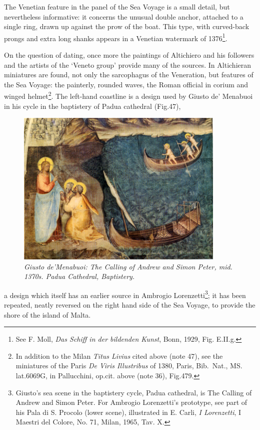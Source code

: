 \documentclass[a4paper,12pt]{article}
\begin{document}
The Venetian feature in the panel of the Sea Voyage is a small detail,
but nevertheless informative: it concerns the unusual double anchor,
attached to a single ring, drawn up against the prow of the boat.
This type, with curved-back prongs and extra long shanks appears in a
Venetian watermark of 1376\footnote{See F. Moll, \textit{Das Schiff in
der bildenden Kunst}, Bonn, 1929, Fig. E.II.g.}.

On the question of dating, once more the paintings of Altichiero and
his followers and the artists of the `Veneto group' provide many of
the sources. In Altichieran miniatures are found, not only the
sarcophagus of the Veneration, but features of the Sea Voyage: the
painterly, rounded waves, the Roman official in corium and winged
helmet\footnote{In addition to the Milan \textit{Titus Livius} cited
above (note 47), see the miniatures of the Paris \textit{De Viris
Illustribus} of 1380, Paris, Bib.~Nat., MS. lat.6069G, in Pallucchini,
op.cit. above (note 36), Fig.479.}. The left-hand coastline is a
design used by Giusto de' Menabuoi in his cycle in the baptistery of
Padua cathedral (Fig.47), 
\begin{figure}[htbp]
\centering
\includegraphics[width=10cm]{pics/fig47.png}
\caption[Giusto de'Menabuoi: The Calling of Andrew and Simon Peter,
  mid. 1370s]  
{\it Giusto de'Menabuoi: The Calling of Andrew and Simon Peter, mid. 1370s.
Padua Cathedral, Baptistery.}
\end{figure}
a design which itself has an earlier source
in Ambrogio Lorenzetti\footnote{Giusto's sea scene in the baptistery
cycle, Padua cathedral, is The Calling of Andrew and Simon Peter.  For
Ambrogio Lorenzetti's prototype, see part of his Pala di S. Procolo
(lower scene), illustrated in E. Carli, \textit{I Lorenzetti}, I
Maestri del Colore, No. 71, Milan, 1965, Tav. X.}; it has been
repeated, neatly reversed on the right hand side of the Sea Voyage, to
provide the shore of the island of Malta.
\end{document}
